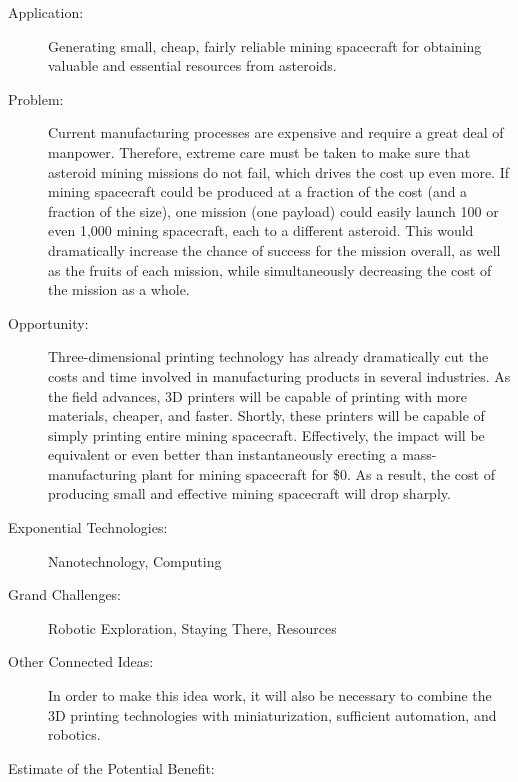\begin{description}

\item[Application:]

Generating small, cheap, fairly reliable mining spacecraft for obtaining
valuable and essential resources from asteroids.


\item[Problem:]

Current manufacturing processes are expensive and require a great
deal of manpower. Therefore, extreme care must be taken to make sure
that asteroid mining missions do not fail, which drives the cost up
even more. If mining spacecraft could be produced at a fraction of
the cost (and a fraction of the size), one mission (one payload) could
easily launch 100 or even 1,000 mining spacecraft, each to a different
asteroid. This would dramatically increase the chance of success for
the mission overall, as well as the fruits of each mission, while
simultaneously decreasing the cost of the mission as a whole.


\item[Opportunity:]

Three-dimensional printing technology has already dramatically cut
the costs and time involved in manufacturing products in several industries.
As the field advances, 3D printers will be capable of printing with
more materials, cheaper, and faster. Shortly, these printers will
be capable of simply printing entire mining spacecraft. Effectively,
the impact will be equivalent or even better than instantaneously
erecting a mass-manufacturing plant for mining spacecraft for \$0.
As a result, the cost of producing small and effective mining spacecraft
will drop sharply.


\item[Exponential Technologies:]

Nanotechnology, Computing


\item[Grand Challenges:]

Robotic Exploration, Staying There, Resources


\item[Other Connected Ideas:]

In order to make this idea work, it will also be necessary to combine
the 3D printing technologies with miniaturization, sufficient automation,
and robotics.


\item[Estimate of the Potential Benefit:]


\end{description}

